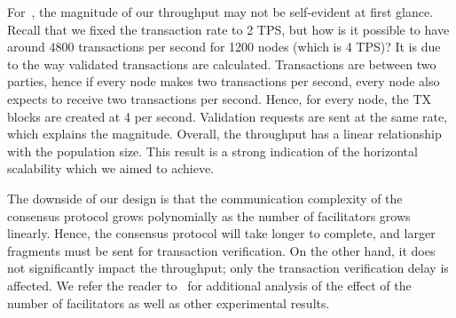 For~,
the magnitude of our throughput may not be self-evident at first glance.
Recall that we fixed the transaction rate to 2 TPS,
but how is it possible to have around 4800 transactions per second for 1200 nodes (which is 4 TPS)?
It is due to the way validated transactions are calculated.
Transactions are between two parties, hence if every node makes two transactions per second,
every node also expects to receive two transactions per second.
Hence, for every node, the TX blocks are created at 4 per second.
Validation requests are sent at the same rate, which explains the magnitude.
Overall, the throughput has a linear relationship with the population size.
This result is a strong indication of the horizontal scalability which we aimed to achieve.

The downside of our design is that the communication complexity of the consensus protocol grows polynomially as the number of facilitators grows linearly.
Hence, the consensus protocol will take longer to complete, and larger fragments must be sent for transaction verification.
On the other hand, it does not significantly impact the throughput;
only the transaction verification delay is affected.
We refer the reader to~\cite[Chapter 5]{checo} for additional analysis of the effect of the number of facilitators as well as other experimental results.

